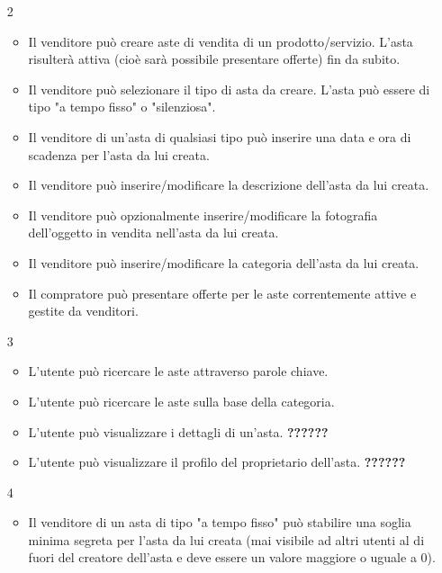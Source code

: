 \begin{itemize}
\begin{itemize}
                \end{itemize}
            \item[2] 
                \begin{itemize}
                    \item Il venditore può creare aste di vendita di un prodotto/servizio. L'asta risulterà attiva (cioè sarà possibile presentare offerte) fin da subito.
                    \item Il venditore può selezionare il tipo di asta da creare. L'asta può essere di tipo "a tempo fisso" o "silenziosa".
                    \item Il venditore di un'asta di qualsiasi tipo può inserire una data e ora di scadenza per l'asta da lui creata.
                    \item Il venditore può inserire/modificare la descrizione dell'asta da lui creata.
                    \item Il venditore può opzionalmente inserire/modificare la fotografia dell'oggetto in vendita nell'asta da lui creata.
                    \item Il venditore può inserire/modificare la categoria dell'asta da lui creata.
                    \item Il compratore può presentare offerte per le aste correntemente attive e gestite da venditori.
                \end{itemize}
            \item[3]
                \begin{itemize}
                    \item L'utente può ricercare le aste attraverso parole chiave.
                    \item L'utente può ricercare le aste sulla base della categoria.
                    \item L'utente può visualizzare i dettagli di un'asta. \textbf{??????}
                    \item L'utente può visualizzare il profilo del proprietario dell'asta. \textbf{??????}
                \end{itemize}
            \item[4]
                \begin{itemize}
                    \item Il venditore di un asta di tipo "a tempo fisso" può stabilire una soglia minima segreta per l'asta da lui creata (mai visibile ad altri utenti al di fuori del creatore dell'asta e deve essere un valore maggiore o uguale a 0).

\end{itemize}
\end{itemize}
